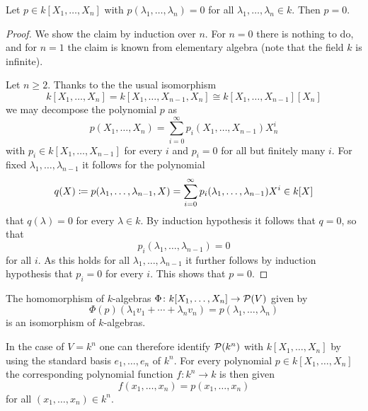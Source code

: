 \begin{lemma}
  \label{lemma: polynomial vanishes everywhere}
  Let $p \in k[X_1, \dotsc, X_n]$ with $p(\lambda_1, \dotsc, \lambda_n) = 0$ for all $\lambda_1, \dotsc, \lambda_n \in k$.
  Then $p = 0$.
\end{lemma}


\begin{proof}
  We show the claim by induction over $n$.
  For $n = 0$ there is nothing to do, and for $n = 1$ the claim is known from elementary algebra (note that the field $k$ is infinite).
  
  Let $n \geq 2$.
  Thanks to the the usual isomorphism
  \[
          k[X_1, \dotsc, X_n]
    =     k[X_1, \dotsc, X_{n-1}, X_n]
    \cong k[X_1, \dotsc, X_{n-1}][X_n]
  \]
  we may decompose the polynomial $p$ as
  \[
      p(X_1, \dotsc, X_n)
    = \sum_{i=0}^\infty p_i(X_1, \dotsc, X_{n-1}) X_n^i
  \]
  with $p_i \in k[X_1, \dotsc, X_{n-1}]$ for every $i$ and $p_i = 0$ for all but finitely many $i$.
  For fixed $\lambda_1, \dotsc, \lambda_{n-1}$ it follows for the polynomial
  \[
              q(X)
    \coloneqq  p(\lambda_1, \dotsc, \lambda_{n-1}, X)
    =         \sum_{i=0}^\infty p_i(\lambda_1, \dotsc, \lambda_{n-1}) X^i
    \in       k[X]
  \]
  that $q(\lambda) = 0$ for every $\lambda \in k$.
  By induction hypothesis it follows that $q = 0$, so that
  \[
      p_i(\lambda_1, \dotsc, \lambda_{n-1})
    = 0
  \]
  for all $i$.
  As this holds for all $\lambda_1, \dotsc, \lambda_{n-1}$ it further follows by induction hypothesis that $p_i = 0$ for every $i$.
  This shows that $p = 0$.
\end{proof}


\begin{corollary}
  \label{corollary: isomorphism poylnomial ring and polynomial maps}
  The homomorphism of $k$-algebras $\Phi \colon k[X_1, \dotsc, X_n] \to \mathcal{P}(V)$ given by
  \[
      \Phi(p)(\lambda_1 v_1 + \dotsb + \lambda_n v_n)
    = p(\lambda_1, \dotsc, \lambda_n)
  \]
  is an isomorphism of $k$-algebras.
\end{corollary}


\begin{fluff}
  \label{fluff: identify polynomials with polynomial maps for kn}
  In the case of $V = k^n$ one can therefore identify $\mathcal{P}(k^n)$ with $k[X_1, \dotsc, X_n]$ by using the standard basis $e_1, \dotsc, e_n$ of $k^n$.
  For every polynomial $p \in k[X_1, \dotsc, X_n]$ the corresponding polynomial function $f \colon k^n \to k$ is then given
  \[
      f(x_1, \dotsc, x_n)
    = p(x_1, \dotsc, x_n)
  \]
  for all $(x_1, \dotsc, x_n) \in k^n$.
\end{fluff}


